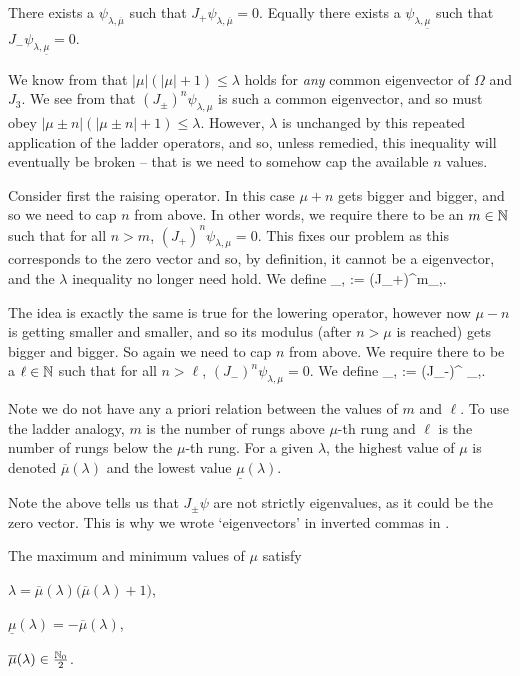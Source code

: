 \bl 
There exists a $\psi_{\lambda,\overline{\mu}}$ such that $J_+\psi_{\lambda,\overline{\mu}} = 0$. Equally there exists a $\psi_{\lambda,\underline{\mu}}$ such that $J_-\psi_{\lambda,\underline{\mu}}=0$.  
\el 

\bq 
We know from  that $|\mu|(|\mu|+1) \leq \lambda$ holds for \emph{any} common eigenvector of $\Omega$ and $J_3$. We see from  that $(J_{\pm})^n\psi_{\lambda,\mu}$ is such a common eigenvector, and so must obey $|\mu\pm n|(|\mu \pm n| +1)\leq \lambda$. However, $\lambda$ is unchanged by this repeated application of the ladder operators, and so, unless remedied,  this inequality will eventually be broken -- that is we need to somehow cap the available $n$ values. 

Consider first the raising operator. In this case $\mu+n$ gets bigger and bigger, and so we need to cap $n$ from above. In other words, we require there to be an $m\in\mathbb{N}$ such that for all $n > m$, $(J_+)^n\psi_{\lambda,\mu} = 0$. This fixes our problem as this corresponds to the zero vector and so, by definition, it cannot be a eigenvector, and the $\lambda$ inequality no longer need hold. We define 
\bse 
\psi_{\lambda,\overline{\mu}} := (J_+)^m\psi_{\lambda,\mu}.
\ese 

The idea is exactly the same is true for the lowering operator, however now $\mu-n$ is getting smaller and smaller, and so its modulus (after $n>\mu$ is reached) gets bigger and bigger. So again we need to cap $n$ from above. We require there to be a $\ell\in\mathbb{N}$ such that for all $n>\ell$, $(J_-)^n\psi_{\lambda,\mu}=0$. We define 
\bse 
\psi_{\lambda,\underline{\mu}} := (J_-)^{\ell} \psi_{\lambda,\mu}.
\ese 

Note we do not have any a priori relation between the values of $m$ and $\ell$. To use the ladder analogy, $m$ is the number of rungs above $\mu$-th rung and $\ell$ is the number of rungs below the $\mu$-th rung. For a given $\lambda$, the highest value of $\mu$ is denoted $\overline{\mu}(\lambda)$ and the lowest value $\underline{\mu}(\lambda)$. 
\eq 

\br 
Note the above tells us that $J_{\pm}\psi$ are not strictly eigenvalues, as it could be the zero vector. This is why we wrote `eigenvectors' in inverted commas in .
\er 

\bp 
The maximum and minimum values of $\mu$ satisfy 
\ben[label=(\roman*)]
\item $\lambda = \overline{\mu}(\lambda)\big(\overline{\mu}(\lambda)+1\big)$,
\item $\underline{\mu}(\lambda) = - \overline{\mu}(\lambda)$,
\item $\overline{\mu}(\lambda)\in\frac{\mathbb{N}_0}{2}$.
\een 
\ep 

